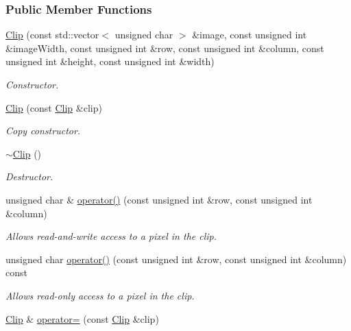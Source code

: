 \subsubsection*{Public Member Functions}
\begin{CompactItemize}
\item 
\hyperlink{class_clip_6264e0334483ad8e0631842a18ac5bc9}{Clip} (const std::vector$<$ unsigned char $>$ \&image, const unsigned int \&imageWidth, const unsigned int \&row, const unsigned int \&column, const unsigned int \&height, const unsigned int \&width)
\begin{CompactList}\small\item\em Constructor. \item\end{CompactList}\item 
\hyperlink{class_clip_affe2f754bd92ded1959f4a7f79d1717}{Clip} (const \hyperlink{class_clip}{Clip} \&clip)
\begin{CompactList}\small\item\em Copy constructor. \item\end{CompactList}\item 
\hyperlink{class_clip_88647ed65e3482b5e0533ec98667b0fa}{$\sim$Clip} ()
\begin{CompactList}\small\item\em Destructor. \item\end{CompactList}\item 
unsigned char \& \hyperlink{class_clip_0f80c2b0f0f177fe9c780c93596f77be}{operator()} (const unsigned int \&row, const unsigned int \&column)
\begin{CompactList}\small\item\em Allows read-and-write access to a pixel in the clip. \item\end{CompactList}\item 
unsigned char \hyperlink{class_clip_16b24276181affc5086cb4fe83269fb8}{operator()} (const unsigned int \&row, const unsigned int \&column) const 
\begin{CompactList}\small\item\em Allows read-only access to a pixel in the clip. \item\end{CompactList}\item 
\hyperlink{class_clip}{Clip} \& \hyperlink{class_clip_8f5c91715408d74402666ab79b952edd}{operator=} (const \hyperlink{class_clip}{Clip} \&clip)

\end{CompactItemize}
